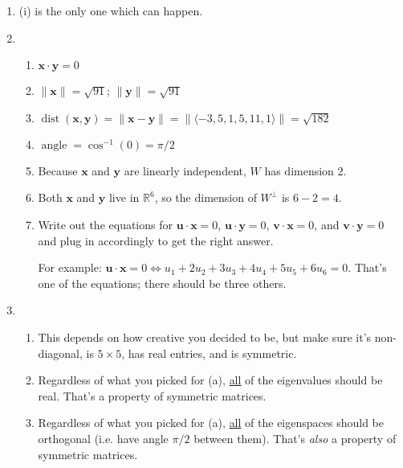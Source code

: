 \documentclass[12pt]{article}
\newcommand{\vect}[1]{\mathbf{#1}}
\newcommand{\dist}{\operatorname{dist}}
\newcommand{\Reals}{\mathbb{R}}
\begin{document}
	\begin{enumerate}[itemsep=6mm]
		\item (i) is the only one which can happen.
		\item
		\begin{enumerate}[label=(\alph*),listparindent=6mm,itemsep=3mm]
			\item $\vect{x}\cdot\vect{y}=0$
			\item $\|\vect{x}\|=\sqrt{91}$; $\|\vect{y}\|=\sqrt{91}$
			\item $\dist(\vect{x},\vect{y})=\|\vect{x}-\vect{y}\|=\|\langle-3,5,1,5,11,1\rangle\|=\sqrt{182}$
			\item $\operatorname{angle}=\cos^{-1}(0)=\pi/2$
			\item Because $\vect{x}$ and $\vect{y}$ are linearly independent, $W$ has dimension $2$.
			\item Both $\vect{x}$ and $\vect{y}$ live in $\Reals^6$, so the dimension of $W^\perp$ is $6-2=4$.
			\item Write out the equations for $\vect{u}\cdot\vect{x}=0$, $\vect{u}\cdot\vect{y}=0$, $\vect{v}\cdot\vect{x}=0$, and $\vect{v}\cdot\vect{y}=0$ and plug in accordingly to get the right answer.
			
			For example: $\vect{u}\cdot\vect{x}=0\Leftrightarrow u_1+2u_2+3u_3+4u_4+5u_5+6u_6=0$. That's one of the equations; there should be three others.
		\end{enumerate}
		
		\item \begin{enumerate}[label=(\alph*),listparindent=6mm,itemsep=3mm]
			\item This depends on how creative you decided to be, but make sure it's non-diagonal, is $5\times 5$, has real entries, and is symmetric.
			\item Regardless of what you picked for (a), \ul{all} of the eigenvalues should be real. That's a property of symmetric matrices.
			\item Regardless of what you picked for (a), \ul{all} of the eigenspaces should be orthogonal (i.e. have angle $\pi/2$ between them). That's \textit{also} a property of symmetric matrices.
		\end{enumerate}
		

\end{enumerate}
\end{document}
